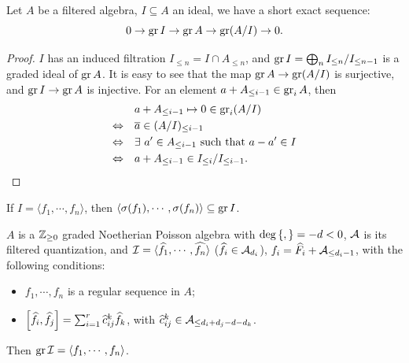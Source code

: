 
\cite{Losev2022Topics}

\begin{lem}
  Let $A$ be a filtered algebra, $I \subseteq A$ an ideal, we have a short exact sequence:
  \[
    0 \to \gr I \to \gr A \to \gr (A/I) \to 0.
  \]
\end{lem}

\begin{proof}
  $I$ has an induced filtration $I_{\leq n} = I \cap A_{\leq n}$, and $\gr I = \bigoplus_{n} I_{\leq n}/I_{\leq n-1}$ is a graded ideal of $\gr A$. It is easy to see that the map $\gr A \to \gr (A/I)$ is surjective, and $\gr I \to \gr A$ is injective. For an element $a + A_{\leq i-1} \in \gr_{i} A$, then
  \begin{align*}
    &a + A_{\leq i-1} \mapsto 0 \in \gr_{i}(A/I) \\
    \Leftrightarrow \quad  &\overline{a} \in (A/I)_{\leq i-1} \\
    \Leftrightarrow \quad  &\exists \ a' \in A_{\leq i-1} \text{ such that } a - a' \in I \\
    \Leftrightarrow \quad  &a + A_{\leq i-1} \in I_{\leq i}/I_{\leq i-1}.
  \end{align*}
\end{proof}

\begin{rk}
  If $I = \langle f_1, \cdots , f_n\rangle$, then $\langle\sigma(f_1),\cdots,\sigma(f_n)\rangle \subseteq \gr I$.
\end{rk}

\begin{prop}
  $A$ is a $\BZ_{\geq0}$ graded Noetherian Poisson algebra with $\deg \Bra{,} = -d < 0$, $\CA$ is its filtered quantization, and $\CI = \langle \widehat{f_1}, \cdots, \widehat{f_n}  \rangle$ ($\widehat{f}_i \in \CA_{d_i}$), $f_i = \widehat{F_i} + \CA_{\leq d_i -1}$, with the following conditions:
\begin{itemize}
  \item $f_1, \cdots, f_n$ is a regular sequence in $A$;
  \item $\sqbra{\widehat{f}_i, \widehat{f}_j} = \sum_{i = 1}^{r} \widehat{c}_{ij}^k \widehat{f}_k$, with $\widehat{c}_{ij}^k  \in \CA_{\leq d_i + d_j -d -d_k}$.
\end{itemize}
Then $\gr \CI = \langle f_1, \cdots, f_n\rangle$.
\end{prop}


